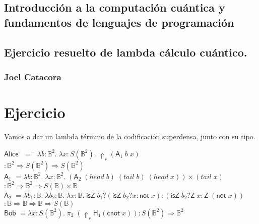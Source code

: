 \documentclass[a4paper,11pt]{article}
\title{}
\author{}
\begin{document}
\maketitle 

\thispagestyle{empty}
\begin{center}
\section*{Introducción a  la computación cuántica y fundamentos de lenguajes de programación} 
\subsection*{Ejercicio resuelto de lambda cálculo cuántico.}
\subsubsection*{Joel Catacora}

\end{center}

\newpage{\pagestyle{empty}\cleardoublepage}

\newpage

\section*
{Ejercicio}

Vamos a dar un lambda término de la codificación superdensa, junto con su tipo.

\begin{tabbing}
  $\textsf{Alice}$ \= $=$ \= $\lambda b : \mathds{B}^2. \; \lambda x : S(\mathds{B}^2). 
  \; \Uparrow_r (\textsf{A}_1 \; b \; x)$ \\
  
  \> \> $: \mathds{B}^2 \Rightarrow S(\mathds{B}^2) \Rightarrow S(\mathds{B}^2)$ \\

  $\textsf{A}_1$ \> $= \lambda b : \mathds{B}^2 . \; \lambda x : \mathds{B}^2. \; ( \textsf{A}_2 \; (head \; b) \; (tail \; b) \; (head \; x)) 
  \times (tail \; x)$ \\
  \> \> $: \mathds{B}^2 \Rightarrow \mathds{B}^2 \Rightarrow S(\mathds{B}) \times \mathds{B}$ \\
  
  $\textsf{A}_2$ \> $= \lambda b_1:\mathds{B}. \; \lambda b_2:\mathds{B}. \; \lambda x : \mathds{B}. \;
  \textsf{isZ} \; b_1 ? (\textsf{isZ} \; b_2 ? x : \textsf{not} \; x) : 
  (\textsf{isZ} \; b_2 ? \textsf{Z} \; x : \textsf{Z} \; (\textsf{not} \; x))$ \\
  \> \> $: \mathds{B} \Rightarrow \mathds{B} \Rightarrow \mathds{B} \Rightarrow S(\mathds{B})$ \\ 

  $\textsf{Bob}$ \> $= \lambda x : S(\mathds{B}^2). \; \pi_{2} \; (\Uparrow_{r} \textsf{H}_{1} (\textsf{cnot} \; x)) 
  : S(\mathds{B}^2) \Rightarrow \mathds{B}^2$
\end{tabbing}
\end{document}
